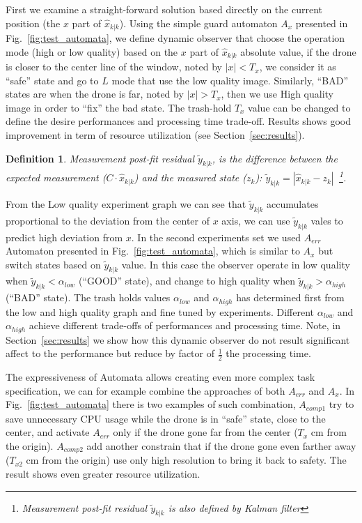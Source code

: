 \documentclass{sig-alternate-ipsn13}
\newtheorem{dfn}[thm]{Definition}
\begin{document}
First we examine a straight-forward solution based directly on the current position (the $x$ part of $\hat{x}_{k|k}$). Using the simple guard automaton $A_{x}$ presented in Fig.~\ref{fig:test_automata}, we define dynamic observer that choose the operation mode (high or low quality) based on the $x$ part of $\hat{x}_{k|k}$ absolute value, if the drone is closer to the center line of the window, noted by $|x| < T_x$, we consider it as ``safe'' state and go to $L$ mode that use the low quality image.
Similarly, ``BAD'' states are when the drone is far, noted by $|x| > T_x$, then we use High quality image in order to ``fix'' the bad state.
The trash-hold $T_x$ value can be changed to define the desire performances and processing time trade-off.
Results shows good improvement in term of resource utilization (see Section~\ref{sec:results}). 

\begin{dfn}
\textit{Measurement post-fit residual} $\tilde{y}_{k|k}$, is the difference between the expected measurement ($C \cdot \hat{x}_{k|k}$) and the measured state ($z_k$): $\tilde{y}_{k|k} = |  \hat{x}_{k|k} - z_k |$~\footnote{ Measurement post-fit residual $\tilde{y}_{k|k}$ is also defined by Kalman filter}.
\end{dfn}
From the Low quality experiment graph we can see that $\tilde{y}_{k|k}$ accumulates proportional to the deviation from the center of $x$ axis, we can use $\tilde{y}_{k|k}$ vales to predict high deviation from $x$.
In the second experiments set we used $A_{err}$ Automaton presented in Fig.~\ref{fig:test_automata}, which is similar to $A_x$ but switch states based on $\tilde{y}_{k|k}$ value.
In this case the observer operate in low quality when $\tilde{y}_{k|k} < \alpha_{low}$ (``GOOD'' state), and change to high quality when $\tilde{y}_{k|k} > \alpha_{high}$ (``BAD'' state).
The trash holds values $ \alpha_{low}$ and $ \alpha_{high}$ has determined first from the low and high quality graph and fine tuned by experiments. 
Different $ \alpha_{low}$ and $ \alpha_{high}$ achieve different trade-offs of performances and processing time.
Note, in Section~\ref{sec:results} we show how this dynamic observer do not result significant affect to the performance but reduce by factor of $\frac{1}{2}$ the processing time.

The expressiveness of Automata allows creating even more complex task specification, we can for example combine the approaches of both $A_{err}$ and $A_{x}$.
In Fig.~\ref{fig:test_automata} there is two examples of such combination, $A_{comp1}$ try to save unnecessary CPU usage while the drone is in ``safe'' state, close to the center, and activate $A_{err}$ only if the drone gone far from the center ($T_{x}$ cm from the origin).
$A_{comp2}$ add another constrain that if the drone gone even farther away ($T_{x2}$ cm from the origin) use only high resolution to bring it back to safety.
The result shows even greater resource utilization.
\end{document}
